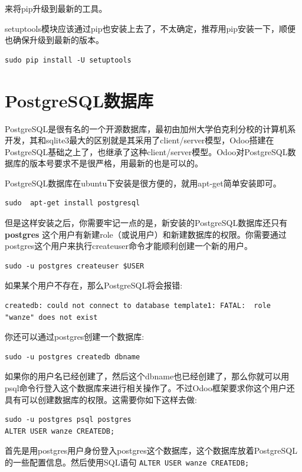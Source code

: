 \documentclass[11pt,a4paper]{sphinxmanual}
\begin{document}
来将pip升级到最新的工具。

setuptools模块应该通过pip也安装上去了，不太确定，推荐用pip安装一下，顺便也确保升级到最新的版本。

\begin{verbatim}
sudo pip install -U setuptools
\end{verbatim}


\section{PostgreSQL数据库}
\label{sec-3-1}
PostgreSQL是很有名的一个开源数据库，最初由加州大学伯克利分校的计算机系开发，其和sqlite3最大的区别就是其采用了client/server模型，Odoo搭建在PostgreSQL基础之上了，也继承了这种client/server模型。Odoo对PostgreSQL数据库的版本号要求不是很严格，用最新的也是可以的。

PostgreSQL数据库在ubuntu下安装是很方便的，就用apt-get简单安装即可。

\begin{verbatim}
sudo  apt-get install postgresql
\end{verbatim}

但是这样安装之后，你需要牢记一点的是，新安装的PostgreSQL数据库还只有 \textbf{postgres} 这个用户有新建role（或说用户）和新建数据库的权限。你需要通过postgres这个用户来执行createuser命令才能顺利创建一个新的用户。


\begin{Verbatim}
sudo -u postgres createuser $USER
\end{Verbatim}

如果某个用户不存在，那么PostgreSQL将会报错: 
\begin{Verbatim}
createdb: could not connect to database template1: FATAL:  role "wanze" does not exist
\end{Verbatim}


你还可以通过postgres创建一个数据库: 
\begin{Verbatim}
sudo -u postgres createdb dbname
\end{Verbatim}

如果你的用户名已经创建了，然后这个dbname也已经创建了，那么你就可以用psql命令行登入这个数据库来进行相关操作了。不过Odoo框架要求你这个用户还具有可以创建数据库的权限。这需要你如下这样去做: 

\begin{Verbatim}
sudo -u postgres psql postgres
ALTER USER wanze CREATEDB;
\end{Verbatim}

首先是用postgres用户身份登入postgres这个数据库，这个数据库放着PostgreSQL的一些配置信息。然后使用SQL语句 \verb~ALTER USER wanze CREATEDB;~
\end{document}

